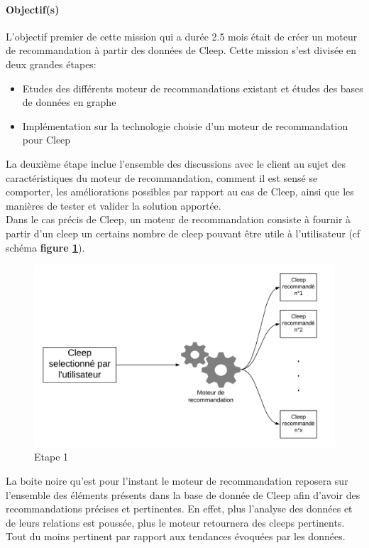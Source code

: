\documentclass{article} %
\begin{document}
\paragraph{Objectif(s)\\}

L'objectif premier de cette mission qui a durée 2.5 mois était de créer un moteur de recommandation à partir des données de Cleep. Cette mission s'est divisée en deux grandes étapes:
\begin{itemize}
	\itemsep 0em
	\item Etudes des différents moteur de recommandations existant et études des bases de données en graphe
	\item Implémentation sur la technologie choisie d'un moteur de recommandation pour Cleep
\end{itemize}
La deuxième étape inclue l'ensemble des discussions avec le client au sujet des caractéristiques du moteur de recommandation, comment il est sensé se comporter, les améliorations possibles par rapport au cas de Cleep, ainsi que les manières de tester et valider la solution apportée.\\
Dans le cas précis de Cleep, un moteur de recommandation consiste à fournir à partir d'un cleep un certains nombre de cleep pouvant être utile à l'utilisateur (cf schéma \textbf{figure \ref{fig:reco}}). 

\begin{figure}[!h]
	\centering
	\includegraphics[keepaspectratio = true,scale=0.4]{reco.png}
	\caption{Etape 1}
	\label{fig:reco}
\end{figure}

La boite noire qu'est pour l'instant le moteur de recommandation reposera sur l'ensemble des éléments présents dans la base de donnée de Cleep afin d'avoir des recommandations précises et pertinentes. En effet, plus l'analyse des données et de leurs relations est poussée, plus le moteur retournera des cleeps pertinents. Tout du moins pertinent par rapport aux tendances évoquées par les données.
\end{document}
